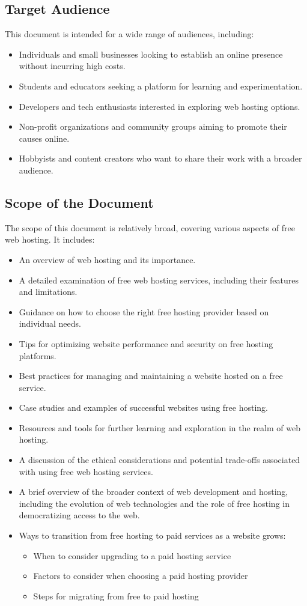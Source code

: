 \subsection{Target Audience}
This document is intended for a wide range of audiences, including:
\begin{itemize}
    \item Individuals and small businesses looking to establish an online presence without incurring high costs.
    \item Students and educators seeking a platform for learning and experimentation.
    \item Developers and tech enthusiasts interested in exploring web hosting options.
    \item Non-profit organizations and community groups aiming to promote their causes online.
    \item Hobbyists and content creators who want to share their work with a broader audience.
\end{itemize}

\subsection{Scope of the Document}
The scope of this document is relatively broad, covering various aspects of free web hosting. It includes:
\begin{itemize}
    \item An overview of web hosting and its importance.
    \item A detailed examination of free web hosting services, including their features and limitations.
    \item Guidance on how to choose the right free hosting provider based on individual needs.
    \item Tips for optimizing website performance and security on free hosting platforms.
    \item Best practices for managing and maintaining a website hosted on a free service.
    \item Case studies and examples of successful websites using free hosting.
    \item Resources and tools for further learning and exploration in the realm of web hosting.
    \item A discussion of the ethical considerations and potential trade-offs associated with using free web hosting services.
    \item A brief overview of the broader context of web development and hosting, including the evolution of web technologies and the role of free hosting in democratizing access to the web.
    \item Ways to transition from free hosting to paid services as a website grows:
    \begin{itemize}
        \item When to consider upgrading to a paid hosting service
        \item Factors to consider when choosing a paid hosting provider
        \item Steps for migrating from free to paid hosting
    \end{itemize}
\end{itemize}